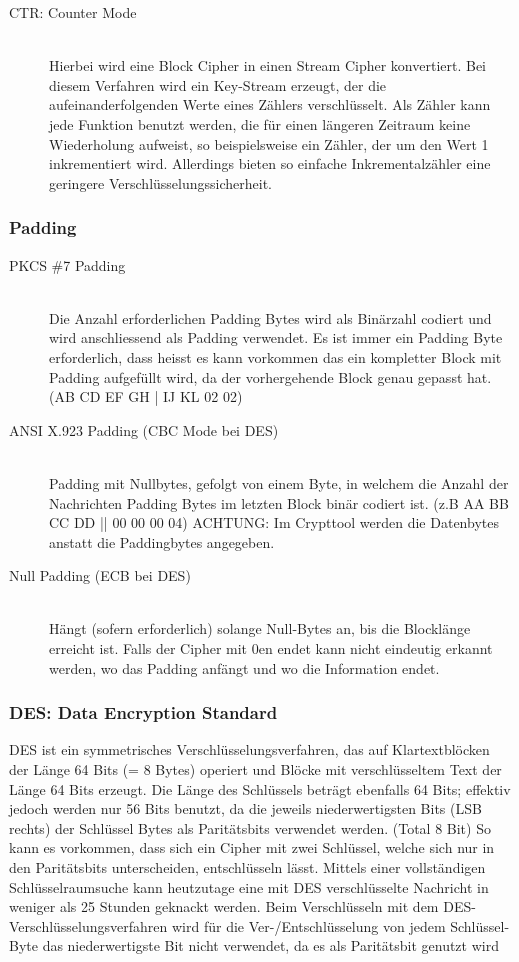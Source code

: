 \begin{description}
	\item[CTR: Counter Mode] \hfill \\
	Hierbei wird eine Block Cipher in einen Stream Cipher konvertiert. Bei diesem Verfahren wird ein Key-Stream erzeugt, der die aufeinanderfolgenden Werte eines Zählers verschlüsselt. Als Zähler kann jede Funktion benutzt werden, die für einen längeren Zeitraum keine Wiederholung aufweist, so beispielsweise ein Zähler, der um den Wert 1 inkrementiert wird. Allerdings bieten so einfache Inkrementalzähler eine geringere Verschlüsselungssicherheit. 
\end{description}
	
\subsubsection{Padding}
\begin{description}
	\item[PKCS \#7 Padding] \hfill \\ Die Anzahl erforderlichen Padding Bytes wird als Binärzahl codiert und wird anschliessend als Padding verwendet. Es ist immer ein Padding Byte erforderlich, dass heisst es kann vorkommen das ein kompletter Block mit Padding aufgefüllt wird, da der vorhergehende Block genau gepasst hat.
	(AB CD EF GH | IJ KL 02 02)
	\item[ANSI X.923 Padding (CBC Mode bei DES)] \hfill \\ Padding mit Nullbytes, gefolgt von einem Byte, in welchem die Anzahl der Nachrichten Padding Bytes im letzten Block binär codiert ist. (z.B AA BB CC DD || 00 00 00 04) ACHTUNG: Im Crypttool werden die Datenbytes anstatt die Paddingbytes angegeben.
	\item[Null Padding (ECB bei DES)] \hfill \\ Hängt (sofern erforderlich) solange Null-Bytes an, bis die Blocklänge erreicht ist. Falls der Cipher mit 0en endet kann nicht eindeutig erkannt werden, wo das Padding anfängt und wo die Information endet. 
\end{description}

\subsubsection{DES: Data Encryption Standard}
DES ist ein symmetrisches Verschlüsselungsverfahren, das auf Klartextblöcken der Länge 64 Bits (= 8 Bytes) operiert und Blöcke mit verschlüsseltem Text der Länge 64 Bits erzeugt. Die Länge des Schlüssels beträgt ebenfalls 64 Bits; effektiv jedoch werden nur 56 Bits benutzt, da die jeweils niederwertigsten Bits (LSB rechts) der Schlüssel Bytes als Paritätsbits verwendet werden. (Total 8 Bit) So kann es vorkommen, dass sich ein Cipher mit zwei Schlüssel, welche sich nur in den Paritätsbits unterscheiden, entschlüsseln lässt. Mittels einer vollständigen Schlüsselraumsuche kann heutzutage eine mit DES verschlüsselte Nachricht in weniger als 25 Stunden geknackt werden. Beim Verschlüsseln mit dem DES-Verschlüsselungsverfahren wird für die Ver-/Entschlüsselung von jedem Schlüssel-Byte das niederwertigste Bit nicht verwendet, da es als Paritätsbit genutzt wird

